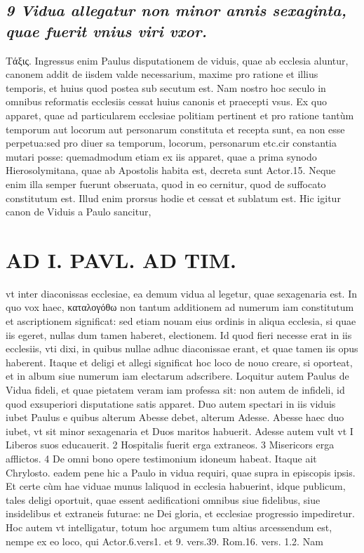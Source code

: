 \documentclass{article}
\begin{document}
\begin{pages}
\subsection*{\textit{9 Vidua allegatur non minor annis sexaginta, quae fuerit vnius viri vxor. }}\pstart Τάξις. Ingressus enim Paulus disputationem de viduis, quae ab ecclesia aluntur, canonem addit de iisdem valde necessarium, maxime pro ratione et illius temporis, et huius quod postea sub secutum est. Nam nostro hoc seculo in omnibus reformatis ecclesiis cessat huius canonis et praecepti vsus. Ex quo apparet, quae ad particularem ecclesiae politiam pertinent et pro ratione tantùm temporum aut locorum aut personarum constituta et recepta sunt, ea non esse perpetua:sed pro diuer sa temporum, locorum, personarum etc.cir constantia mutari posse: quemadmodum etiam ex iis apparet, quae a prima synodo Hierosolymitana, quae ab Apostolis habita est, decreta sunt Actor.15. Neque enim illa semper fuerunt obseruata, quod in eo cernitur, quod de suffocato constitutum est. Illud enim prorsus hodie et cessat et sublatum est.  \pend\pstart Hic igitur canon de Viduis a Paulo sancitur,  \pend
\section*{AD I. PAVL. AD TIM. }
\marginpar{[ p.279 ]}\pstart vt inter diaconissas ecclesiae, ea demum vidua al legetur, quae sexagenaria est. In quo vox haec, καταλογόθω non tantum additionem ad numerum iam constitutum et ascriptionem significat: sed etiam nouam eius ordinis in aliqua ecclesia, si quae iis egeret, nullas dum tamen haberet, electionem. Id quod fieri necesse erat in iis ecclesiis, vti dixi, in quibus nullae adhuc diaconissae erant, et quae tamen iis opus haberent. Itaque et deligi et allegi significat hoc loco de nouo creare, si oporteat, et in album siue numerum iam electarum adscribere.  \pend\pstart Loquitur autem Paulus de Vidua fideli, et quae pietatem veram iam professa sit: non autem de infideli, id quod exsuperiori disputatione satis apparet.  \pend\pstart Duo autem spectari in iis viduis iubet Paulus e quibus alterum Abesse debet, alterum Adesse. Abesse haec duo iubet, vt sit minor sexagenaria et Duos maritos habuerit. Adesse autem vult vt I Liberos suos educauerit. 2 Hospitalis fuerit erga extraneos. 3 Misericors erga afflictos. 4 De omni bono opere testimonium idoneum habeat. Itaque ait Chrylosto. eadem pene hic a Paulo in vidua requiri, quae supra in episcopis ipsis. Et certe cùm hae viduae munus laliquod in ecclesia habuerint, idque publicum, tales deligi oportuit, quae essent aedificationi omnibus siue fidelibus, siue insidelibus et extraneis futurae: ne Dei gloria, et ecclesiae progressio impediretur.  \pend\pstart Hoc autem vt intelligatur, totum hoc argumem tum altius arcessendum est, nempe ex eo loco, qui Actor.6.vers1. et 9. vers.39. Rom.16. vers. 1.2. Nam  \pend

\end{pages}
\end{document}
